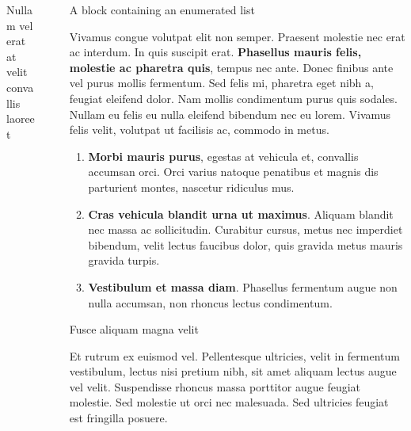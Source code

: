 \documentclass[final]{beamer}
\newlength{\sepwidth}
\newlength{\colwidth}
\newcommand{\separatorcolumn}{\begin{column}{\sepwidth}\end{column}}
\begin{document}
\begin{frame}[t]
\begin{columns}[t]
\begin{column}{\colwidth}
\begin{block}{Nullam vel erat at velit convallis laoreet}
                \end{block}

            \end{column}

            \separatorcolumn

            \begin{column}{\colwidth}

                \begin{block}{A block containing an enumerated list}

                    Vivamus congue volutpat elit non semper. Praesent molestie nec erat ac
                    interdum. In quis suscipit erat. \textbf{Phasellus mauris felis, molestie
                    ac pharetra quis}, tempus nec ante. Donec finibus ante vel purus mollis
                    fermentum. Sed felis mi, pharetra eget nibh a, feugiat eleifend dolor. Nam
                    mollis condimentum purus quis sodales. Nullam eu felis eu nulla eleifend
                    bibendum nec eu lorem. Vivamus felis velit, volutpat ut facilisis ac,
                    commodo in metus.

                    \begin{enumerate}
                        \item \textbf{Morbi mauris purus}, egestas at vehicula et, convallis
                        accumsan orci. Orci varius natoque penatibus et magnis dis parturient
                        montes, nascetur ridiculus mus.
                        \item \textbf{Cras vehicula blandit urna ut maximus}. Aliquam blandit nec
                        massa ac sollicitudin. Curabitur cursus, metus nec imperdiet bibendum,
                        velit lectus faucibus dolor, quis gravida metus mauris gravida turpis.
                        \item \textbf{Vestibulum et massa diam}. Phasellus fermentum augue non
                        nulla accumsan, non rhoncus lectus condimentum.
                    \end{enumerate}

                \end{block}

                \begin{block}{Fusce aliquam magna velit}

                    Et rutrum ex euismod vel. Pellentesque ultricies, velit in fermentum
                    vestibulum, lectus nisi pretium nibh, sit amet aliquam lectus augue vel
                    velit. Suspendisse rhoncus massa porttitor augue feugiat molestie. Sed
                    molestie ut orci nec malesuada. Sed ultricies feugiat est fringilla
                    posuere.


\end{block}
\end{column}
\end{columns}
\end{frame}
\end{document}
